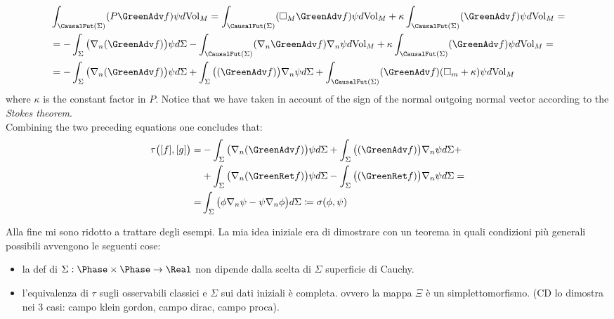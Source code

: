 \documentclass[Main]{subfiles}
\begin{document}
\begin{example}
\begin{align}
			&\int_{\CausalFut(\Sigma)} (P \GreenAdv f) \psi d\textrm{Vol}_M	=
			\int_{\CausalFut(\Sigma)} (\square_M \GreenAdv f) \psi d\textrm{Vol}_M	 + \kappa \int_{\CausalFut(\Sigma)} ( \GreenAdv f) \psi d\textrm{Vol}_M  = \nonumber\\
			&= -\int_\Sigma \big( \nabla_n ( \GreenAdv f) \big) \psi d\Sigma
				- \int_{\CausalFut(\Sigma)} (\nabla_n \GreenAdv f) \nabla_n \psi d\textrm{Vol}_M
				+ \kappa \int_{\CausalFut(\Sigma)} ( \GreenAdv f) \psi d\textrm{Vol}_M  =\nonumber\\
			&= -\int_\Sigma \big( \nabla_n ( \GreenAdv f) \big) \psi d\Sigma 	+\int_\Sigma \big( ( \GreenAdv f) \big)\nabla_n  \psi d\Sigma  + \int_{\CausalFut(\Sigma)} ( \GreenAdv f) ( \square_m + \kappa) \psi d\textrm{Vol}_M
		\end{align}
		where $\kappa$ is the constant factor in $P$.
		Notice that we have taken in account of the sign of the normal outgoing normal vector according to the \emph{Stokes theorem}.\\
		Combining the two preceding equations one concludes that:
		\begin{align}
		\tau\big( [f], [g] \big) =&  -\int_\Sigma \big( \nabla_n ( \GreenAdv f) \big) \psi d\Sigma
		+\int_\Sigma \big( ( \GreenAdv f) \big)\nabla_n  \psi d\Sigma +\nonumber\\
		&+\int_\Sigma \big( \nabla_n ( \GreenRet f) \big) \psi d\Sigma
		-\int_\Sigma \big( ( \GreenRet f) \big)\nabla_n  \psi d\Sigma =  \nonumber\\
		=& \int_\Sigma \big( \phi \nabla_n \psi - \psi \nabla_n \phi \big) d\Sigma \coloneqq\sigma (\phi, \psi)
		\end{align}

	\end{example}

\ifToninus
	\begin{Warning}
	Alla fine mi sono ridotto a trattare degli esempi. La mia idea iniziale era di dimostrare con un teorema in quali condizioni più generali possibili avvengono le seguenti cose:
	\begin{itemize}
		\item la def di $\Sigma: \Phase \times \Phase \rightarrow \Real$ non dipende dalla scelta di $\Sigma$ superficie di Cauchy.
		\item l'equivalenza di $\tau$ sugli osservabili classici e $\Sigma$  sui dati iniziali è completa. ovvero la mappa $\Xi$ è un simplettomorfismo. (CD lo dimostra nei 3 casi: campo klein gordon, campo dirac, campo proca).
	\end{itemize}
	\end{Warning}
\fi
\end{document}
